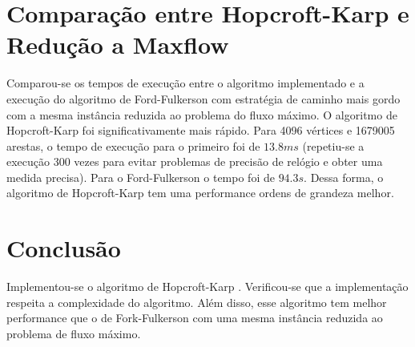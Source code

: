 \documentclass{iiufrgs}
\begin{document}
\section{Comparação entre Hopcroft-Karp e Redução a Maxflow}
Comparou-se os tempos de execução entre o algoritmo implementado e a execução do algoritmo de Ford-Fulkerson com estratégia de caminho mais gordo com a mesma instância reduzida ao
problema do fluxo máximo.
O algoritmo de Hopcroft-Karp foi significativamente mais rápido. Para 4096 vértices e 1679005 arestas, o tempo de execução para o primeiro foi de $13.8 ms$ (repetiu-se a execução 300 vezes 
para evitar problemas de precisão de relógio e obter uma medida precisa). Para o Ford-Fulkerson o tempo foi de $94.3s$. Dessa forma, o algoritmo de Hopcroft-Karp tem uma performance ordens
de grandeza melhor.


\section{Conclus\~ao}
Implementou-se o algoritmo de Hopcroft-Karp . Verificou-se que a implementação respeita a
complexidade do algoritmo. Além disso, esse algoritmo tem melhor performance que o de Fork-Fulkerson com uma mesma instância reduzida ao problema de fluxo máximo.
\end{document}
